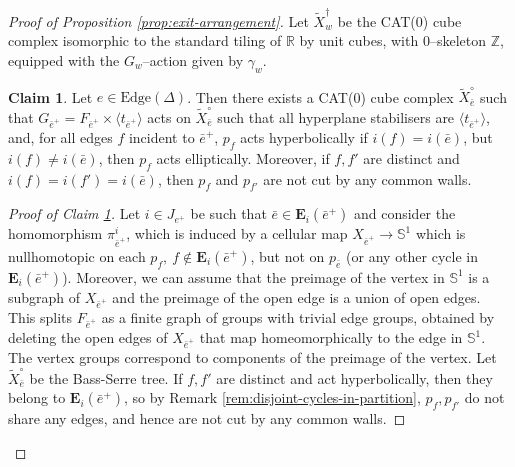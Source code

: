 \documentclass[11pt,oneside]{amsart}
\theoremstyle{definition}
\newtheorem{claim}{Claim}
\newcommand{\field}[1]{\mathbb{#1}}
\newcommand{\integers}{\ensuremath{\field{Z}}}
\newcommand{\reals}{\ensuremath{\field{R}}}
\newcommand{\edges}{\mathrm{Edge}}
\begin{document}
\begin{proof}[Proof of Proposition \ref{prop:exit-arrangement}]
Let $\widetilde X_w^\dagger$ be the CAT(0) cube complex isomorphic to the standard tiling of $\reals$ by unit cubes, with $0$--skeleton $\integers$, equipped with the $G_w$--action given by $\gamma_w$.

\begin{claim}\label{claim:exit-action}
Let $e\in\edges(\Delta)$.  Then there exists a CAT(0) cube complex $\widetilde X_{\bar e}^\circ$ such that $G_{\bar e^+}=F_{\bar e^+}\times \langle t_{\bar e^+}\rangle$ acts on $\widetilde X_{\bar e}^\circ$ such that all hyperplane stabilisers are $\langle t_{\bar e^+}\rangle$, and, for all edges $f$ incident to $\bar e^+$,  
$p_{f}$ acts hyperbolically if $i(f)=i(\bar e)$, but $i(f)\neq i(\bar e)$, then $p_f$ acts elliptically.  Moreover, if $f,f'$ are distinct and $i(f)=i(f')=i(\bar e)$, then $p_f$ and $p_{f'}$ are not cut by any common walls.  
\end{claim}

\begin{proof}[Proof of Claim \ref{claim:exit-action}]
Let $i\in J_{e^+}$ be such that $\bar e\in \mathbf E_i(\bar e^+)$ and consider the homomorphism $\pi^i_{\bar e^+}$, which is induced by a cellular map $X_{\bar e^+}\to \mathbb S^1$ which is nullhomotopic on each  $p_f,\ f\not\in \mathbf E_i(\bar e^+)$, but not on $p_{\bar e}$ (or any other cycle in $\mathbf E_i(\bar e^+)$).  Moreover, we can assume that the preimage of the vertex in $\mathbb S^1$ is a subgraph of $X_{\bar e^+}$ and the preimage of the open edge is a union of open edges.  This splits $F_{\bar e^+}$ as a finite graph of groups with trivial edge groups, obtained by deleting the open edges of $X_{\bar e^+}$ that map homeomorphically to the edge in $\mathbb S^1$.  The vertex groups correspond to components of the preimage of the vertex.  Let $\widetilde X_{\bar e}^\circ$ be the Bass-Serre tree.  If $f,f'$ are distinct and act hyperbolically, then they belong to $\mathbf E_{i}(\bar e^+)$, so by Remark \ref{rem:disjoint-cycles-in-partition}, $p_f,p_{f'}$ do not share any edges, and hence are not cut by any common walls.
\end{proof}


\end{proof}
\end{document}

